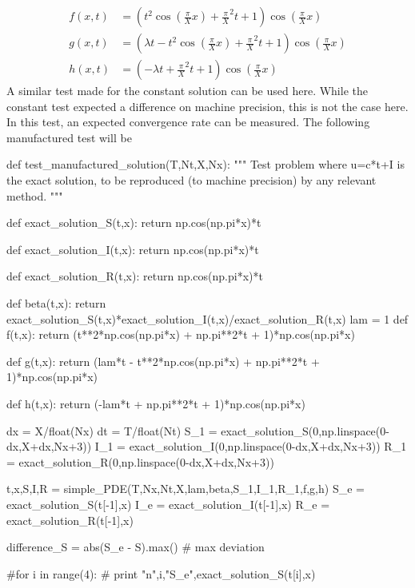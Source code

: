 \documentclass[%
twoside,                 %
final,                   %
10pt]{article}
\begin{document}
\begin{equation} \label{eq:manu_func}
	\begin{aligned}
	f(x,t) &= (t^2\cos(\frac{\pi}{X} x) + \frac{\pi}{X}^2t + 1)\cos(\frac{\pi}{X} x)\\
	g(x,t) &= (\lambda t - t^2\cos(\frac{\pi}{X} x) + \frac{\pi}{X}^2t + 1)\cos(\frac{\pi}{X} x)\\
	h(x,t) &= (-\lambda t + \frac{\pi}{X}^2t + 1)\cos(\frac{\pi}{X} x)
	\end{aligned}
\end{equation}
A similar test made for the constant solution can be used here. While the constant test expected a difference on machine precision, this is not the case here. In this test, an expected convergence rate can be measured. The following manufactured test will be

\bpycod
def test_manufactured_solution(T,Nt,X,Nx):
    """
    Test problem where u=c*t+I is the exact solution, to be
    reproduced (to machine precision) by any relevant method.
    """
    
    def exact_solution_S(t,x):
        return np.cos(np.pi*x)*t

    def exact_solution_I(t,x):
        return np.cos(np.pi*x)*t

    def exact_solution_R(t,x):
        return np.cos(np.pi*x)*t


    def beta(t,x):
        return exact_solution_S(t,x)*exact_solution_I(t,x)/exact_solution_R(t,x)
    lam = 1
    def f(t,x):
        return (t**2*np.cos(np.pi*x) + np.pi**2*t + 1)*np.cos(np.pi*x) 

    def g(t,x):
        return (lam*t - t**2*np.cos(np.pi*x) + np.pi**2*t + 1)*np.cos(np.pi*x)

    def h(t,x):
        return (-lam*t + np.pi**2*t + 1)*np.cos(np.pi*x)
        

    dx = X/float(Nx)
    dt = T/float(Nt)
    S_1 = exact_solution_S(0,np.linspace(0-dx,X+dx,Nx+3))
    I_1 = exact_solution_I(0,np.linspace(0-dx,X+dx,Nx+3))
    R_1 = exact_solution_R(0,np.linspace(0-dx,X+dx,Nx+3))
     
    t,x,S,I,R = simple_PDE(T,Nx,Nt,X,lam,beta,S_1,I_1,R_1,f,g,h)
    S_e = exact_solution_S(t[-1],x)
    I_e = exact_solution_I(t[-1],x)
    R_e = exact_solution_R(t[-1],x)
    
    difference_S = abs(S_e - S).max()  # max deviation

    
    #for i in range(4):
    #    print "n",i,"S_e",exact_solution_S(t[i],x)
    
\end{document}
